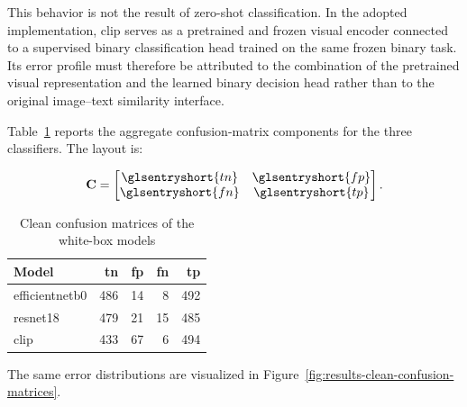 This behavior is not the result of zero-shot classification. In the adopted
implementation, \gls{clip} serves as a pretrained and frozen visual encoder
connected to a supervised binary classification head trained on the same
frozen binary task. Its error profile must therefore be attributed to the
combination of the pretrained visual representation and the learned binary
decision head rather than to the original image--text similarity interface.

Table~\ref{tab:results-clean-confusion-matrices} reports the aggregate
confusion-matrix components for the three classifiers. The layout is:

\[
\mathbf{C}
=
\begin{bmatrix}
\glsentryshort{tn} & \glsentryshort{fp} \\
\glsentryshort{fn} & \glsentryshort{tp}
\end{bmatrix}.
\]

\begin{table}[H]
\centering
\caption{Clean confusion matrices of the white-box models}
\label{tab:results-clean-confusion-matrices}
\begin{tabular}{@{}l r r r r@{}}
\toprule
\textbf{Model} &
\textbf{\gls{tn}} &
\textbf{\gls{fp}} &
\textbf{\gls{fn}} &
\textbf{\gls{tp}} \\
\midrule

\gls{efficientnetb0}
& 486
& 14
& 8
& 492 \\

\gls{resnet18}
& 479
& 21
& 15
& 485 \\

\gls{clip}
& 433
& 67
& 6
& 494 \\

\bottomrule
\end{tabular}
\end{table}

The same error distributions are visualized in
Figure~\ref{fig:results-clean-confusion-matrices}.

